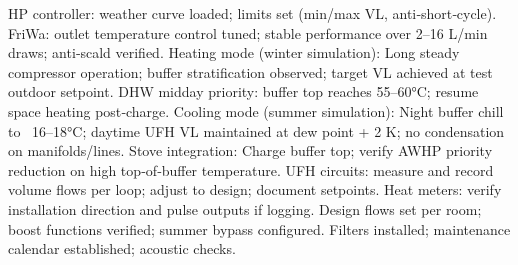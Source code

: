 \markdownRendererUlItem HP controller: weather curve loaded; limits set (min/max VL, anti‑short‑cycle).\markdownRendererUlItemEnd 
\markdownRendererUlItem FriWa: outlet temperature control tuned; stable performance over 2–16 L/min draws; anti‑scald verified.\markdownRendererUlItemEnd 
\markdownRendererUlEndTight \markdownRendererInterblockSeparator
{}
\markdownRendererSectionEnd \markdownRendererSectionBegin
{}\markdownRendererInterblockSeparator
{}\markdownRendererUlBeginTight
\markdownRendererUlItem Heating mode (winter simulation):\markdownRendererUlItemEnd 
\markdownRendererUlItem Long steady compressor operation; buffer stratification observed; target VL achieved at test outdoor setpoint.\markdownRendererUlItemEnd 
\markdownRendererUlItem DHW midday priority: buffer top reaches 55–60°C; resume space heating post‑charge.\markdownRendererUlItemEnd 
\markdownRendererUlItem Cooling mode (summer simulation):\markdownRendererUlItemEnd 
\markdownRendererUlItem Night buffer chill to ~16–18°C; daytime UFH VL maintained at dew point + 2 K; no condensation on manifolds/lines.\markdownRendererUlItemEnd 
\markdownRendererUlItem Stove integration:\markdownRendererUlItemEnd 
\markdownRendererUlItem Charge buffer top; verify AWHP priority reduction on high top‑of‑buffer temperature.\markdownRendererUlItemEnd 
\markdownRendererUlEndTight \markdownRendererInterblockSeparator
{}
\markdownRendererSectionEnd \markdownRendererSectionBegin
{}\markdownRendererInterblockSeparator
{}\markdownRendererUlBeginTight
\markdownRendererUlItem UFH circuits: measure and record volume flows per loop; adjust to design; document setpoints.\markdownRendererUlItemEnd 
\markdownRendererUlItem Heat meters: verify installation direction and pulse outputs if logging.\markdownRendererUlItemEnd 
\markdownRendererUlEndTight \markdownRendererInterblockSeparator
{}
\markdownRendererSectionEnd \markdownRendererSectionBegin
{}\markdownRendererInterblockSeparator
{}\markdownRendererUlBeginTight
\markdownRendererUlItem Design flows set per room; boost functions verified; summer bypass configured.\markdownRendererUlItemEnd 
\markdownRendererUlItem Filters installed; maintenance calendar established; acoustic checks.\markdownRendererUlItemEnd 
\markdownRendererUlEndTight \markdownRendererInterblockSeparator
{}
\markdownRendererSectionEnd \markdownRendererSectionBegin
{}\markdownRendererInterblockSeparator
{}\markdownRendererUlBeginTight
